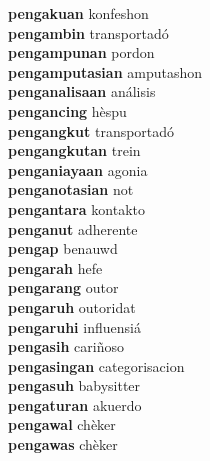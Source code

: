 \textbf{pengakuan } konfeshon \\
\textbf{pengambin } transportadó \\
\textbf{pengampunan } pordon \\
\textbf{pengamputasian } amputashon \\
\textbf{penganalisaan } análisis \\
\textbf{pengancing } hèspu \\
\textbf{pengangkut } transportadó \\
\textbf{pengangkutan } trein \\
\textbf{penganiayaan } agonia \\
\textbf{penganotasian } not \\
\textbf{pengantara } kontakto \\
\textbf{penganut } adherente \\
\textbf{pengap } benauwd \\
\textbf{pengarah } hefe \\
\textbf{pengarang } outor \\
\textbf{pengaruh } outoridat \\
\textbf{pengaruhi } influensiá \\
\textbf{pengasih } cariñoso \\
\textbf{pengasingan } categorisacion \\
\textbf{pengasuh } babysitter \\
\textbf{pengaturan } akuerdo \\
\textbf{pengawal } chèker \\
\textbf{pengawas } chèker \\
